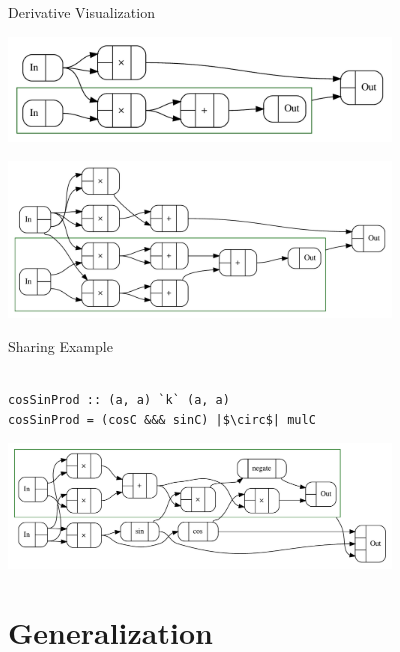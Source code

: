 \documentclass[12pt]{beamer}
\begin{document}
\begin{frame}[fragile]{Derivative Visualization}
  \begin{center}
    \includegraphics[width=4in]{figures/sqr-adf}
  \end{center}
  \vspace{1cm}
  \begin{center}
    \includegraphics[width=4in]{figures/magSqr-adf}
  \end{center}
\end{frame}

\begin{frame}[fragile]{Sharing Example}

\begin{adjustwidth}{-1.8em}{-1.8em}
\begin{verbatim}

cosSinProd :: (a, a) `k` (a, a)
cosSinProd = (cosC &&& sinC) |$\circ$| mulC
\end{verbatim}
\end{adjustwidth}

\begin{center}
  \includegraphics[width=4in]{figures/cosSinProd-adf}
\end{center}
\end{frame}


\section{Generalization}
\end{document}
